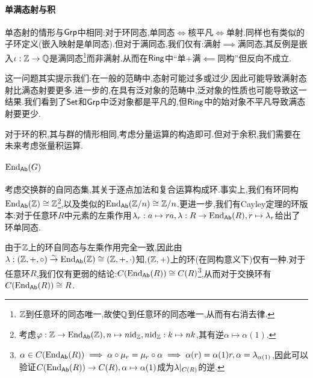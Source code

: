 \documentclass[11pt]{article} %
\begin{document}
\paragraph{单满态射与积}
单态射的情形与$\mathsf{Grp}$中相同:对于环同态,单同态$\iff$核平凡$\iff$单射.同样也有类似的子环定义(嵌入映射是单同态).但对于满同态,我们仅有:满射$\implies$满同态,其反例是嵌入$\iota:\mathbb{Z}\to\mathbb{Q}$是满同态\footnote{$\mathbb{Z}$到任意环的同态唯一,故使$\mathbb{Q}$到任意环的同态唯一,从而有右消去律.}而非满射.从而在$\mathsf{Ring}$中``单+满$\impliedby$同构''但反向不成立.

这一问题其实提示我们:在一般的范畴中,态射可能过多或过少,因此可能导致满射态射比满态射要更多.进一步的,在具有泛对象的范畴中,泛对象的性质也可能导致这一结果.我们看到了$\mathsf{Set}$和$\mathsf{Grp}$中泛对象都是平凡的,但$\mathsf{Ring}$中的始对象不平凡导致满态射要更少.

对于环的积,其与群的情形相同,考虑分量运算的构造即可.但对于余积,我们需要在未来考虑张量积运算.

\paragraph{$\operatorname{End}_{\mathsf{Ab}}(G)$}
考虑交换群的自同态集,其关于逐点加法和复合运算构成环.事实上,我们有环同构$\operatorname{End}_{\mathsf{Ab}}(\mathbb{Z})\cong\mathbb{Z}$\footnote{考虑$\varphi:\mathbb{Z}\to\operatorname{End}_{\mathsf{Ab}}(\mathbb{Z}),n\mapsto n\mathrm{id}_{\mathbb{Z}}, n\mathrm{id}_{\mathbb{Z}}:k\mapsto nk$,其有逆$\alpha\mapsto \alpha(1)$.},以及类似的$\operatorname{End}_{\mathsf{Ab}}(\mathbb{Z}/n)\cong \mathbb{Z}/n$.更进一步,我们有Cayley定理的环版本:对于任意环$R$中元素的左乘作用$\lambda_r:a\mapsto ra, \lambda:R\to \operatorname{End}_{\mathsf{Ab}}(R), r\mapsto \lambda_r$给出了环单同态.

由于$\mathbb{Z}$上的环自同态与左乘作用完全一致,因此由$\lambda: (\mathbb{Z},+,\circ)\overset{\sim}{\to} \operatorname{End}_{\mathsf{Ab}}(\mathbb{Z})\cong (\mathbb{Z},+,\cdot)$知,$(\mathbb{Z},+)$上的环(在同构意义下)仅有一种.对于任意环$R$,我们仅有更弱的结论:$C(\operatorname{End}_{\mathsf{Ab}}(R))\cong C(R)$\footnote{$\alpha\in C(\operatorname{End}_{\mathsf{Ab}}(R))\implies \alpha\circ\mu_r=\mu_r\circ\alpha\implies\alpha(r)=\alpha(1)r,\alpha=\lambda_{\alpha(1)}$,因此可以验证$C(\operatorname{End}_{\mathsf{Ab}}(R))\to C(R),\alpha\mapsto\alpha(1)$成为$\lambda|_{C(R)}$的逆.},从而对于交换环有$C(\operatorname{End}_{\mathsf{Ab}}(R))\cong R$.
\end{document}
